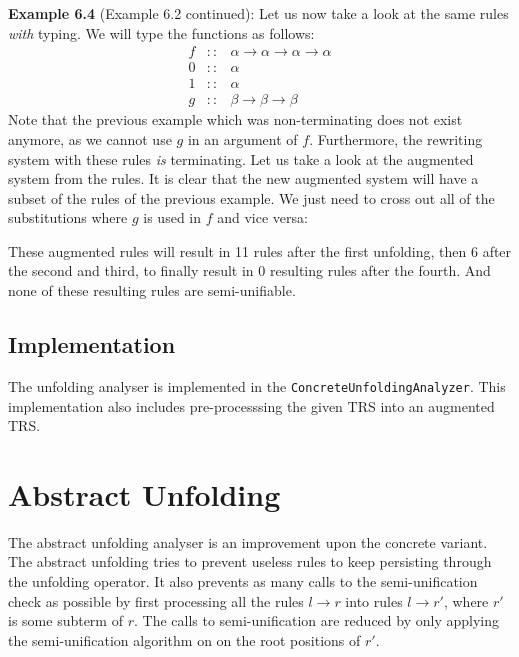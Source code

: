 \textbf{Example 6.4} (Example 6.2 continued): Let us now take a look at the same rules \textit{with} typing. We will type the functions as follows:
\[
\begin{array}{rcl}
    f & :: & \alpha \rightarrow \alpha \rightarrow \alpha \rightarrow \alpha \\
    0 & :: & \alpha \\
    1 & :: & \alpha \\
    g & :: & \beta \rightarrow \beta \rightarrow \beta 
\end{array}
\]
Note that the previous example which was non-terminating does not exist anymore, as we cannot use $g$ in an argument of $f$. Furthermore, the rewriting system with these rules \textit{is} terminating. Let us take a look at the augmented system from the rules. It is clear that the new augmented system will have a subset of the rules of the previous example. We just need to cross out all of the substitutions where $g$ is used in $f$ and vice versa:
\begin{center}
\end{center}
These augmented rules will result in 11 rules after the first unfolding, then 6 after the second and third, to finally result in 0 resulting rules after the fourth. And none of these resulting rules are semi-unifiable. 

\subsection{Implementation}
The unfolding analyser is implemented in the \texttt{ConcreteUnfoldingAnalyzer}. This implementation also includes pre-processsing the given TRS into an augmented TRS.  

\section{Abstract Unfolding}
The abstract unfolding analyser is an improvement upon the concrete variant. The abstract unfolding tries to prevent useless rules to keep persisting through the unfolding operator. It also prevents as many calls to the semi-unification check as possible by first processing all the rules $l \rightarrow r$ into rules $l \rightarrow r'$, where $r'$ is some subterm of $r$. The calls to semi-unification are reduced by only applying the semi-unification algorithm on on the root positions of $r'$. 

